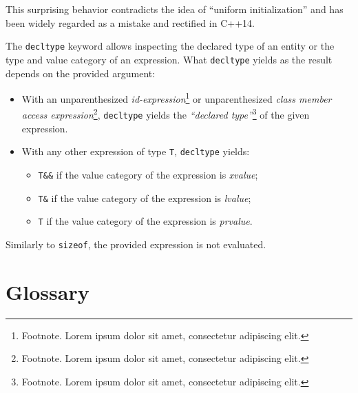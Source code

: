 \documentclass[twoside,10pt,letterpaper,usenames]{newstyle-PearsonGeneric-7-38}
\begin{document}
This surprising behavior contradicts the idea of ``uniform
initialization'' and has been widely regarded as a mistake and rectified
in C++14.

The \texttt{decltype} keyword allows inspecting the declared type of an
entity or the type and value category of an expression. What
\texttt{decltype} yields as the result depends on the provided argument:

\begin{itemize}
\item{With an unparenthesized \emph{id-expression}\cprotect\footnote{Footnote. Lorem ipsum dolor sit amet, consectetur adipiscing elit.} or unparenthesized \emph{class member access expression}\cprotect\footnote{Footnote. Lorem ipsum dolor sit amet, consectetur adipiscing elit.}, \texttt{decltype} yields the \emph{``declared type''}\cprotect\footnote{Footnote. Lorem ipsum dolor sit amet, consectetur adipiscing elit.} of the given expression.}
\item{With any other expression of type \texttt{T}, \texttt{decltype} yields:\begin{itemize}
\item{\texttt{T\&\&} if the value category of the expression is \emph{xvalue};}
\item{\texttt{T\&} if the value category of the expression is \emph{lvalue};}
\item{\texttt{T} if the value category of the expression is \emph{prvalue}.}
\end{itemize}
}
\end{itemize}

Similarly to \texttt{sizeof}, the provided expression is not evaluated.

\newpage

\cleardoublepage

\chapter*{Glossary}\label{Glossary}


\end{document}
